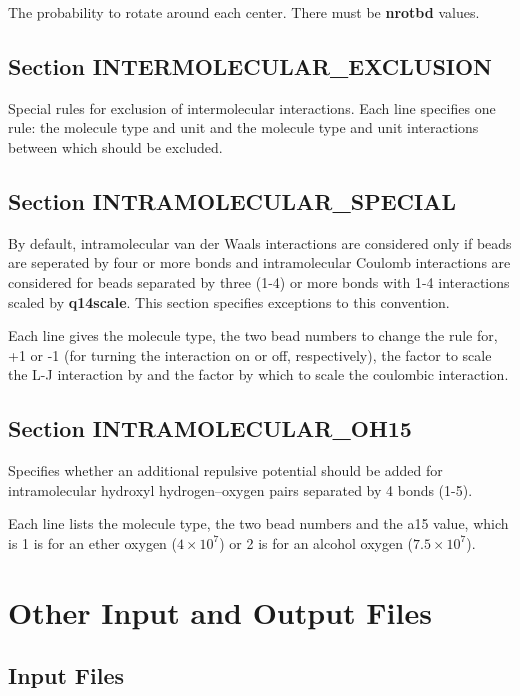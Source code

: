\documentclass[12pt,letterpaper]{article}
\begin{document}
 The probability to rotate around
each center. There must be {\bf nrotbd} values.

\subsection{Section \textbf{INTERMOLECULAR\_EXCLUSION}}
Special rules for exclusion of intermolecular interactions.
Each line specifies one rule: the molecule type and unit and
the molecule type and unit interactions between which should
be excluded.

\subsection{Section \textbf{INTRAMOLECULAR\_SPECIAL}}
\label{intra_special}
By default, intramolecular van der Waals interactions are
considered only if beads are seperated by four or more bonds
and intramolecular Coulomb interactions are considered for
beads separated by three (1-4) or more bonds with 1-4
interactions scaled by {\bf q14scale}. This section
specifies exceptions to this convention.

Each line gives the molecule type, the two bead numbers to
change the rule for, +1 or -1 (for turning the interaction
on or off, respectively), the factor to scale the L-J
interaction by and the factor by which to scale the
coulombic interaction.

\subsection{Section \textbf{INTRAMOLECULAR\_OH15}}
Specifies whether an additional repulsive potential should
be added for intramolecular hydroxyl hydrogen--oxygen pairs
separated by 4 bonds (1-5).

Each line lists the molecule type, the two bead numbers and
the a15 value, which is 1 is for an ether oxygen ($4\times
10^7$) or 2 is for an alcohol oxygen ($7.5\times 10^7$).

\section{Other Input and Output Files}

\subsection{Input Files}
\end{document}
